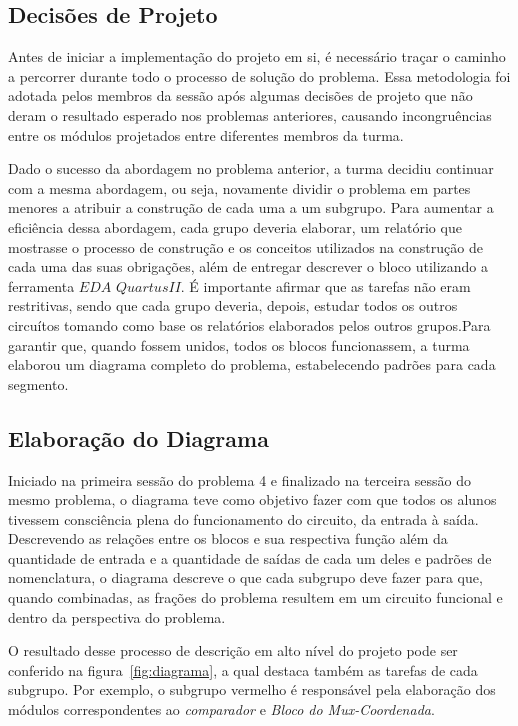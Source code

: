 \documentclass[12pt]{article}
\begin{document}
\subsection{Decisões de Projeto}

Antes de iniciar a implementação do projeto em si, é necessário traçar o caminho a percorrer durante todo o processo de solução do problema. Essa metodologia foi adotada pelos membros da sessão após algumas decisões de projeto que não deram o resultado esperado nos problemas anteriores, causando incongruências entre os módulos projetados entre diferentes membros da turma. 


Dado o sucesso da abordagem no problema anterior, a turma decidiu continuar com a mesma abordagem, ou seja, novamente dividir o problema em partes menores a atribuir a construção de cada uma a um subgrupo. Para aumentar a eficiência dessa abordagem, cada grupo deveria elaborar, um relatório que mostrasse o processo de construção e os conceitos utilizados na construção de cada uma das suas obrigações, além de entregar descrever o bloco utilizando a ferramenta $EDA$ $Quartus II$. É importante afirmar que as tarefas não eram restritivas, sendo que cada grupo deveria, depois, estudar todos os outros circuítos tomando como base os relatórios elaborados pelos outros grupos.Para garantir que, quando fossem unidos, todos os blocos funcionassem, a turma elaborou um diagrama completo do problema, estabelecendo padrões para cada segmento.

\subsection{Elaboração do Diagrama}
Iniciado na primeira sessão do problema 4 e finalizado na terceira sessão do mesmo problema, o diagrama teve como objetivo fazer com que todos os alunos tivessem consciência plena do funcionamento do circuito, da entrada à saída. Descrevendo as relações entre os blocos e sua respectiva função além da quantidade de entrada e a quantidade de saídas de cada um deles e padrões de nomenclatura, o diagrama descreve o que cada subgrupo deve fazer para que, quando combinadas, as frações do problema resultem em um circuito funcional e dentro da perspectiva do problema. 

O resultado desse processo de descrição em alto nível do projeto pode ser conferido na figura~\ref{fig:diagrama}, a qual destaca também as tarefas de cada subgrupo. Por exemplo, o subgrupo vermelho é responsável pela elaboração dos módulos correspondentes ao \textit{comparador} e \textit{Bloco do Mux-Coordenada}.
\end{document}
